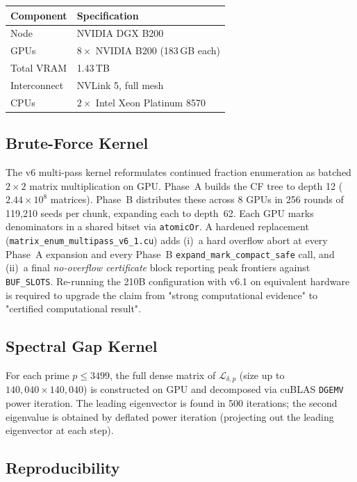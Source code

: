 \documentclass[11pt,a4paper]{amsart}
\theoremstyle{definition}
\begin{document}
\begin{center}
\begin{tabular}{ll}
\toprule
Component & Specification \\
\midrule
Node & NVIDIA DGX B200 \\
GPUs & $8\times$ NVIDIA B200 (183\,GB each) \\
Total VRAM & 1.43\,TB \\
Interconnect & NVLink 5, full mesh \\
CPUs & $2\times$ Intel Xeon Platinum 8570 \\
\bottomrule
\end{tabular}
\end{center}

\subsection{Brute-Force Kernel}

The v6 multi-pass kernel reformulates continued fraction enumeration as batched $2\times 2$ matrix multiplication on GPU. Phase~A builds the CF tree to depth 12 ($2.44 \times 10^8$ matrices). Phase~B distributes these across 8 GPUs in 256 rounds of 119{,}210 seeds per chunk, expanding each to depth~62. Each GPU marks denominators in a shared bitset via \texttt{atomicOr}. A hardened replacement (\texttt{matrix\_enum\_multipass\_v6\_1.cu}) adds (i)~a hard overflow abort at every Phase~A expansion and every Phase~B \texttt{expand\_mark\_compact\_safe} call, and (ii)~a final \emph{no-overflow certificate} block reporting peak frontiers against \texttt{BUF\_SLOTS}. Re-running the 210B configuration with v6.1 on equivalent hardware is required to upgrade the claim from "strong computational evidence" to "certified computational result".

\subsection{Spectral Gap Kernel}

For each prime $p \leq 3499$, the full dense matrix of $\mathcal{L}_{\delta,p}$ (size up to $140{,}040 \times 140{,}040$) is constructed on GPU and decomposed via cuBLAS \texttt{DGEMV} power iteration. The leading eigenvector is found in 500 iterations; the second eigenvalue is obtained by deflated power iteration (projecting out the leading eigenvector at each step).

\subsection{Reproducibility}
\end{document}
